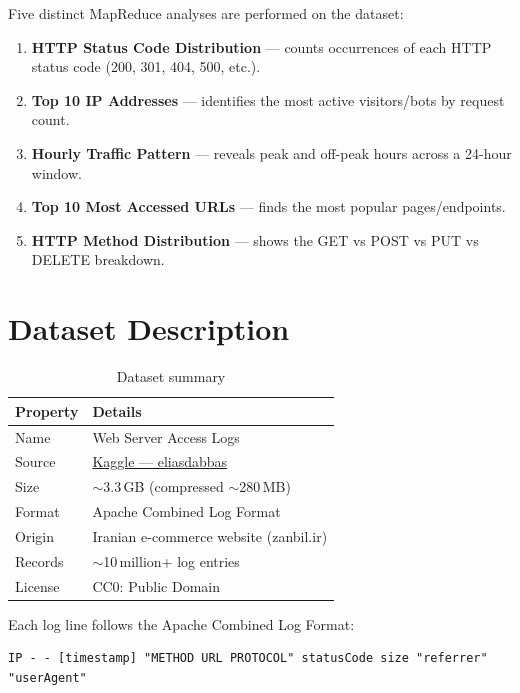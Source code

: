 \documentclass[12pt,a4paper]{article}
\begin{document}
Five distinct MapReduce analyses are performed on the dataset:
\begin{enumerate}
    \item \textbf{HTTP Status Code Distribution} --- counts occurrences of each HTTP status code (200, 301, 404, 500, etc.).
    \item \textbf{Top 10 IP Addresses} --- identifies the most active visitors/bots by request count.
    \item \textbf{Hourly Traffic Pattern} --- reveals peak and off-peak hours across a 24-hour window.
    \item \textbf{Top 10 Most Accessed URLs} --- finds the most popular pages/endpoints.
    \item \textbf{HTTP Method Distribution} --- shows the GET vs POST vs PUT vs DELETE breakdown.
\end{enumerate}

\section{Dataset Description}

\begin{table}[H]
\centering
\caption{Dataset summary}
\begin{tabular}{@{}ll@{}}
\hline
\textbf{Property} & \textbf{Details} \\ \hline
Name        & Web Server Access Logs \\
Source      & \href{https://www.kaggle.com/datasets/eliasdabbas/web-server-access-logs}{Kaggle --- eliasdabbas} \\
Size        & $\sim$3.3\,GB (compressed $\sim$280\,MB) \\
Format      & Apache Combined Log Format \\
Origin      & Iranian e-commerce website (zanbil.ir) \\
Records     & $\sim$10\,million+ log entries \\
License     & CC0: Public Domain \\
\hline
\end{tabular}
\end{table}

Each log line follows the Apache Combined Log Format:

\begin{lstlisting}
IP - - [timestamp] "METHOD URL PROTOCOL" statusCode size "referrer" "userAgent"
\end{lstlisting}
\end{document}
